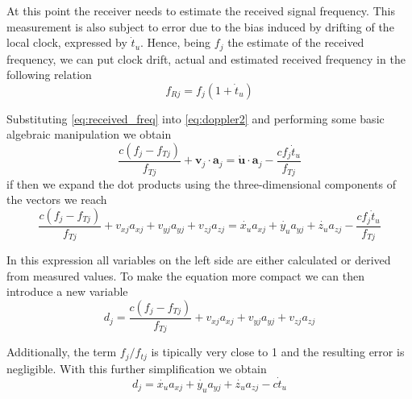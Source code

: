 At this point the receiver needs to estimate the received signal frequency. This
measurement is also subject to error due to the bias induced by drifting of the
local clock, expressed by $\dot t_u$. Hence, being $f_j$ the estimate of the
received frequency, we can put clock drift, actual and estimated received
frequency in the following relation
\begin{equation} \label{eq:received_freq}
  f_{Rj} = f_j (1 + \dot t_u)
\end{equation}

Substituting \ref{eq:received_freq} into \ref{eq:doppler2} and performing some
basic algebraic manipulation we obtain
\begin{equation}
  \frac{c(f_j - f_{Tj})}{f_{Tj}}+\bm{v}_j \cdot \bm{a}_j = \bm{\dot u} \cdot \bm{a}_j - \frac{c f_j \dot t_u}{f_{Tj}}
\end{equation}
if then we expand the dot products using the three-dimensional components of the
vectors we reach
\begin{equation}
  \frac{c(f_j - f_{Tj})}{f_{Tj}} + v_{xj}a_{xj} + v_{yj}a_{yj} + v_{zj}a_{zj} =
  \dot{x_u} a_{xj} + \dot{y_u} a_{yj} + \dot{z_u} a_{zj} - \frac{c f_j \dot t_u}{f_{Tj}}
\end{equation}

In this expression all variables on the left side are either calculated or
derived from measured values. To make the equation more compact we can then
introduce a new variable
\begin{equation}
  d_j = \frac{c(f_j - f_{Tj})}{f_{Tj}} + v_{xj}a_{xj} + v_{yj}a_{yj} + v_{zj}a_{zj}
\end{equation}

Additionally, the term $f_j/f_{tj}$ is tipically very close to 1 and the
resulting error is negligible. With this further simplification we obtain
\begin{equation}
  d_j = \dot{x_u} a_{xj} + \dot{y_u} a_{yj} + \dot{z_u} a_{zj} - c \dot t_u
\end{equation}

